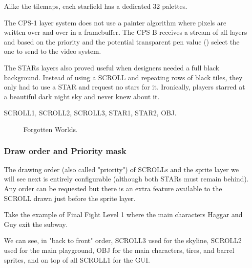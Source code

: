 Alike the tilemaps, each starfield has a dedicated 32 palettes.

\begin{trivia}
The CPS-1 layer system does not use a painter algorithm where pixels are written over and over in a framebuffer. The CPS-B receives a stream of all layers and based on the priority and the potential transparent pen value () select the one to send to the video system.
\end{trivia}

The STARs layers also proved useful when designers needed a full black background. Instead of using a SCROLL and repeating rows of black tiles, they only had to use a STAR and request no stars for it. Ironically, players starred at a beautiful dark night sky and never knew about it.

 SCROLL1,  SCROLL2,  SCROLL3,  STAR1,  STAR2,  OBJ.

\vfill
\begin{figure}[!b]
 \caption*{Forgotten Worlds.}%
 \end{figure}%
\pagebreak









\subsubsection{Draw order and Priority mask}


The drawing order (also called "priority") of SCROLLs and the sprite layer we will see next is entirely configurable (although both STARs must remain behind). Any order can be requested but there is an extra feature available to the SCROLL drawn just before the sprite layer.

Take the example of Final Fight Level 1 where the main characters Haggar and Guy exit the subway. 

We can see, in "back to front" order,   SCROLL3 used for the skyline,  SCROLL2 used for the main playground,  OBJ for the main characters, tires, and barrel sprites, and on top of all  SCROLL1 for the GUI.


